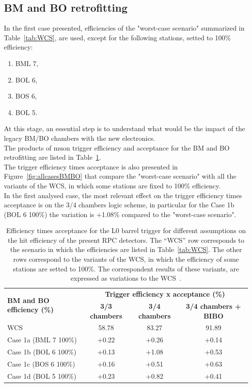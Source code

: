 \subsection{BM and BO retrofitting}
\label{sec:BMBO_retrofit}
In the first case presented, efficiencies of the "worst-case scenario" summarized in Table~\ref{tab:WCS}, are used, except for the following stations, setted to 100\% efficiency:
\renewcommand{\labelenumii}{\Lowercase{enumii}}
\begin{enumerate}
\item BML 7,
\item BOL 6,
\item BOS 6,
\item BOL 5.
\end{enumerate}
At this stage, an essential step is to understand what would be the impact of the legacy BM/BO chambers with the new electronics.\\
The products of muon trigger efficiency and acceptance for the BM and BO retrofitting are listed in Table~\ref{tab:allcasesBMBO}.\\
The trigger efficiency times acceptance is also presented in Figure~\ref{fig:allcasesBMBO} that compare the "worst-case scenario" with all the variants of the WCS, in which some stations are fixed to 100\% efficiency.\\
In the first analysed case, the most relevant effect on the trigger efficiency times acceptance is on the 3/4 chambers logic scheme, in particular for the Case 1b (BOL 6 100\%) the variation is +1.08\% compared to the "worst-case scenario".
\begin{table}[h]
	\begin{center}
		\small
		\begin{tabular}{l|c|c|c}
			\hline
			\multirow{2}{*}{\textbf{BM and BO efficiency (\%)}} & \multicolumn{3}{c}{\textbf{Trigger efficiency x acceptance (\%)}}\\
			\cline{2-4}   
			& \textbf{3/3 chambers} & \textbf{3/4 chambers} & \textbf{3/4 chambers + BIBO}\\
			\hline 
			WCS 												& 58.78 				& 83.27 		& 91.89\\
			Case 1a (BML 7 100\%) 								& +0.22                 & +0.26 		& +0.14\\
			Case 1b (BOL 6 100\%) 								& +0.13 				& +1.08 		& +0.53\\
			Case 1c (BOS 6 100\%) 								& +0.16 				& +0.51 		& +0.63\\
			Case 1d (BOL 5 100\%) 								& +0.23 				& +0.82 		& +0.41\\		
			\hline 
		\end{tabular} 
		\caption{Efficiency times acceptance for the L0 barrel trigger for different assumptions on the hit efficiency of the present RPC detectors. The “WCS” row corresponds to the scenario in which the efficiencies are listed in Table~\ref{tab:WCS}. The other rows correspond to the variants of the WCS, in which the efficiency of some stations are setted to 100\%. The correspondent results of these variants, are expressed as variations to the WCS~\cite{Marcoccia:2693982}.} 
		\label{tab:allcasesBMBO}
	\end{center} 
\end{table} 

